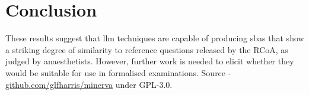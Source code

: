 \documentclass[]{scrartcl}
\begin{document}
\section{Conclusion}
These results suggest that \ac{llm} techniques are capable of producing \acp{sba} that show a striking degree of similarity to reference questions released by the RCoA, as judged by anaesthetists. However, further work is needed to elicit whether they would be suitable for use in formalised examinations.
\newline
Source - \href{https://www.github.com/glfharris/minerva}{github.com/glfharris/minerva} under GPL-3.0.
\end{document}
